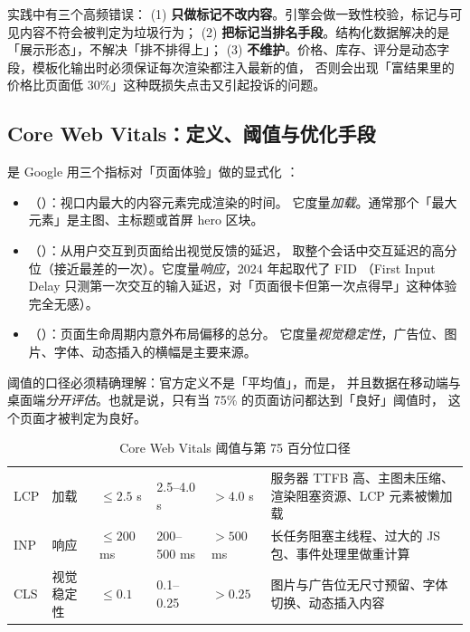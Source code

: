 实践中有三个高频错误：
(1) \textbf{只做标记不改内容}。引擎会做一致性校验，标记与可见内容不符会被判定为垃圾行为；
(2) \textbf{把标记当排名手段}。结构化数据解决的是「展示形态」，不解决「排不排得上」；
(3) \textbf{不维护}。价格、库存、评分是动态字段，模板化输出时必须保证每次渲染都注入最新的值，
否则会出现「富结果里的价格比页面低 30\%」这种既损失点击又引起投诉的问题。

\subsection{Core Web Vitals：定义、阈值与优化手段}

 是 Google 用三个指标对「页面体验」做的显式化 \cite{google2024corewebvitals}：

\begin{itemize}
  \item {}（）：视口内最大的内容元素完成渲染的时间。
        它度量\emph{加载}。通常那个「最大元素」是主图、主标题或首屏 hero 区块。
  \item {}（）：从用户交互到页面给出视觉反馈的延迟，
        取整个会话中交互延迟的高分位（接近最差的一次）。它度量\emph{响应}，2024 年起取代了 FID
        （First Input Delay 只测第一次交互的输入延迟，对「页面很卡但第一次点得早」这种体验完全无感）。
  \item {}（）：页面生命周期内意外布局偏移的总分。
        它度量\emph{视觉稳定性}，广告位、图片、字体、动态插入的横幅是主要来源。
\end{itemize}

阈值的口径必须精确理解：官方定义不是「平均值」，而是，
并且数据在移动端与桌面端\emph{分开评估}。也就是说，只有当 75\% 的页面访问都达到「良好」阈值时，
这个页面才被判定为良好。

\begin{table}[htbp]
\centering
\caption{Core Web Vitals 阈值与第 75 百分位口径}
\label{tab:cwv}
\small
\begin{tabularx}{\textwidth}{L{1.6cm} L{2.0cm} L{1.9cm} L{1.9cm} L{2.0cm} Y}
\toprule
{} &  &  &  &  &  \\
\midrule
LCP & 加载 & $\le 2.5$ s & 2.5--4.0 s & $> 4.0$ s & 服务器 TTFB 高、主图未压缩、渲染阻塞资源、LCP 元素被懒加载 \\
INP & 响应 & $\le 200$ ms & 200--500 ms & $> 500$ ms & 长任务阻塞主线程、过大的 JS 包、事件处理里做重计算 \\
CLS & 视觉稳定性 & $\le 0.1$ & 0.1--0.25 & $> 0.25$ & 图片与广告位无尺寸预留、字体切换、动态插入内容 \\
\bottomrule
\end{tabularx}
\end{table}

